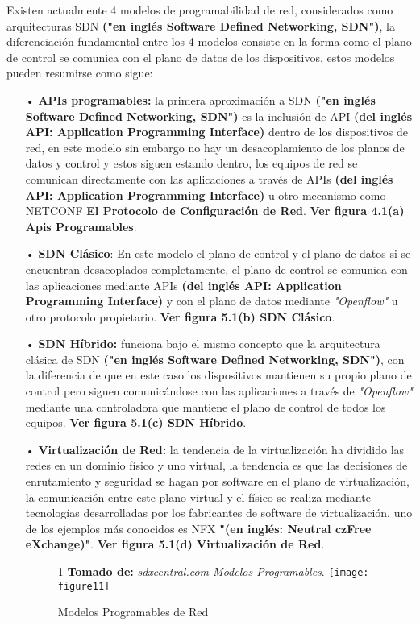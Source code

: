 Existen actualmente 4 modelos de programabilidad de red, considerados como arquitecturas SDN  \textbf{("en inglés Software Defined Networking, SDN")}, la diferenciación fundamental entre los 4 modelos consiste en la forma como el plano de control se comunica con el plano de datos de los dispositivos, estos modelos pueden resumirse como sigue:
\begin{itemize}
\item[•] \textbf{APIs programables:}  la primera aproximación a SDN  \textbf{("en inglés Software Defined Networking, SDN")} es la inclusión de API \textbf{(del inglés API: Application Programming Interface)} dentro de los dispositivos de red, en este modelo sin embargo no hay un desacoplamiento de los planos de datos y control y estos siguen estando dentro, los equipos de red se comunican directamente con las aplicaciones a través de APIs \textbf{(del inglés API: Application Programming Interface)} u otro mecanismo como NETCONF \textbf{El Protocolo de Configuración de Red}. \textbf{Ver figura 4.1(a) Apis Programables}.

\item[•] \textbf{SDN Clásico}: En este modelo el plano de control y el plano de datos si se encuentran desacoplados completamente, el plano de control se comunica con las aplicaciones mediante APIs \textbf{(del inglés API: Application Programming Interface)} y con el plano de datos mediante \textit{"Openflow"} u otro protocolo propietario. \textbf{Ver figura 5.1(b) SDN Clásico}.

\item[•] \textbf{SDN Híbrido:} funciona bajo el mismo concepto que la arquitectura clásica de SDN  \textbf{("en inglés Software Defined Networking, SDN")}, con la diferencia de que en este caso los dispositivos mantienen su propio plano de control pero siguen comunicándose con las aplicaciones a través de \textit{"Openflow"} mediante una controladora que mantiene el plano de control de todos los equipos. \textbf{Ver figura 5.1(c) SDN Híbrido}.

\item[•]\textbf{Virtualización de Red:} la tendencia de la virtualización ha dividido las redes en un dominio físico y uno virtual, la tendencia es que las decisiones de enrutamiento y seguridad se hagan por software en el plano de virtualización, la comunicación entre este plano virtual y el físico se realiza mediante tecnologías desarrolladas por los fabricantes de software de virtualización, uno de los ejemplos más conocidos es NFX \textbf{"(en inglés: Neutral czFree eXchange)"}. \textbf{Ver figura 5.1(d) Virtualización de Red}.

\begin{figure}[htbp]
 \ref{fig:sdxcentral} \textbf{Tomado de:} \textit{sdxcentral.com Modelos  Programables}.
  \centering
    {\texttt{[image: figure11]}}%
  \caption{\footnotesize{Modelos Programables de Red}}
  \label{fig:sdxcentral}
\end{figure}

\end{itemize}
